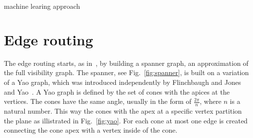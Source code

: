 \documentclass{gd-llncs}
\begin{document}
machine learing approach
\cite{kwon2017would}

\cite{lin2013interactive}

\cite{cosmograph}

\section*{Edge routing}
The edge routing starts, as in~\cite{dwyer2010fast}, by building a spanner graph, an approximation of the full visibility graph. The spanner, see Fig.~\ref{fig:spanner}, is built on a variation of a Yao graph, which was introduced independently by Flinchbaugh and Jones~\cite{flinchbaugh1981strong}  and Yao~\cite{yao1982constructing}. A Yao graph is defined by the set of cones with the apices at the vertices. The cones have the same angle, usually in the form of $\frac{2\pi} {n}$, where $n$ is a natural number. This way the cones with the apex at a specific vertex partition the plane as illistrated in Fig.~\ref{fig:yao}. For each cone at most one edge is created connecting the cone apex with a vertex inside of the cone.
\end{document}
